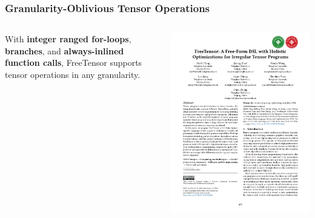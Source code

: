 \documentclass[12pt,aspectratio=169]{beamer}
\begin{document}
    \begin{frame}
        \frametitle{Granularity-Oblivious Tensor Operations}

        \begin{columns}
            \begin{column}{0.5\textwidth}
                With \textbf{integer ranged for-loops}, \textbf{branches}, and \textbf{always-inlined function calls},
                FreeTensor supports tensor operations in any granularity.
            \end{column}
            \begin{column}{0.5\textwidth}
                \includegraphics[page=5,trim=1.9cm 8.5cm 10.5cm 12cm,clip,scale=.9]{paper.pdf}
            \end{column}
        \end{columns}
    \end{frame}
\end{document}
